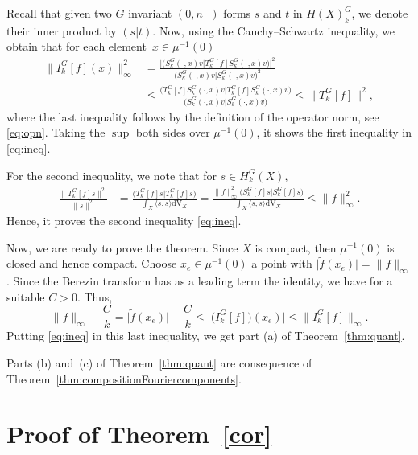 \documentclass[10pt,a4paper]{amsart}
\numberwithin{equation}{section}
\begin{document}
	
	Recall that given two $G$ invariant $(0, n_-)$ forms $s$ and $t$ in $H(X)^G_k$, we denote their inner product by $(s\vert t)$. Now, using the Cauchy--Schwartz inequality, we obtain that for each element~${x\in \mu^{-1}(0)}$
	\begin{align*}
	\big\lVert I^{G}_k[f](x) \big\rVert^2_{\infty}&= \frac{\big\vert\bigl(S^{G}_k(\cdot, x) v\big\vert T^{G}_{k}[f] S^{G}_k(\cdot, x) v\bigr)\big\vert^2}{\bigl(S^{G}_k(\cdot, x) v\big\vert S^{G}_k(\cdot, x) v\bigr)^2} \\
	&\leq \frac{\bigl(T^{G}_{k}[f] S^{G}_k(\cdot, x) v\big\vert T^{G}_{k}[f] S^{G}_k(\cdot, x) v\bigr)}{\bigl(S^{G}_k(\cdot, x) v\big\vert S^{G}_k(\cdot, x) v\bigr)}
	\leq \rVert T^{G}_k[f]\lVert^2,
\end{align*}
 	where the last inequality follows by the definition of the operator norm, see \eqref{eq:opn}. Taking the $\sup$ both sides over $\mu^{-1}(0)$, it shows the first inequality in \eqref{eq:ineq}.
 	
 	For the second inequality, we note that for $s \in H^{G}_k(X)$,
 	\begin{align*}
 \frac{\lVert T^{G}_k[f] s \rVert^2}{\lVert s \rVert^2}&=\frac{\bigl(T^{G}_{k}[f] s \big\vert T^{G}_{k}[f] s\bigr)}{\int_X \langle s, s\rangle \mathrm{dV}_X} = \frac{\lVert f\rVert^2_{\infty} \bigl(S^{G}_{k}[f] s \big\vert S^{G}_{k}[f] s\bigr)}{\int_{X} \langle s, s\rangle \mathrm{dV}_{X}}
 		\leq \lVert f\rVert^2_{\infty} .
 	\end{align*}
 	Hence, it proves the second inequality \eqref{eq:ineq}.
 	
 	Now, we are ready to prove the theorem. Since $X$ is compact, then $\mu^{-1}(0)$ is closed and hence compact. Choose $x_e\in \mu^{-1}(0)$ a point with $\big\lvert \widetilde{f}(x_e)\big\rvert=\lVert f \rVert_{\infty}$. Since the Berezin transform has as a leading term the identity, we have
 	for a suitable $C>0$. Thus,
 	\[ \lVert f \rVert_{\infty}-\frac{C}{k}= \big\lvert \widetilde{f}(x_e)\big\rvert -\frac{C}{k}\leq \big\lvert \bigl(I^{G}_k[f]\bigr)(x_e)\big\rvert \leq \big\lVert I^{G}_k[f]\big\rVert_{\infty} .\]
 	Putting \eqref{eq:ineq} in this last inequality, we get part (a) of Theorem~\ref{thm:quant}.
 	
 	Parts (b) and~(c) of Theorem~\ref{thm:quant} are consequence of Theorem~\ref{thm:compositionFouriercomponents}.
 	

 	\section[Proof of Theorem \ref{cor}]{Proof of Theorem~\ref{cor}}
 	\label{sec:proofcor}
 	
\end{document}
